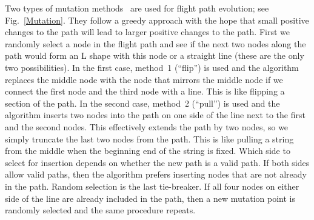 \documentclass[letterpaper, 10 pt, conference]{ieeeconf}
\begin{document}
Two types of mutation methods~\cite{[07GeneticAlgorithm]Mitchell97} are used for flight path evolution; see Fig.~\ref{Mutation}. They follow a greedy approach with the hope that small positive changes to the path will lead to larger positive changes to the path. First we randomly select a node in the flight path and see if the next two nodes along the path would form an L shape with this node or a straight line (these are the only two possibilities). In the first case, method~1 (``flip'') is used and the algorithm replaces the middle node with the node that mirrors the middle node if we connect the first node and the third node with a line. This is like flipping a section of the path. In the second case, method~2 (``pull'') is used and the algorithm inserts two nodes into the path on one side of the line next to the first and the second nodes. This effectively extends the path by two nodes, so we simply truncate the last two nodes from the path. This is like pulling a string from the middle when the beginning end of the string is fixed. Which side to select for insertion depends on whether the new path is a valid path. If both sides allow valid paths, then the algorithm prefers inserting nodes that are not already in the path. Random selection is the last tie-breaker. If all four nodes on either side of the line are already included in the path, then a new mutation point is randomly selected and the same procedure repeats.

\end{document}
